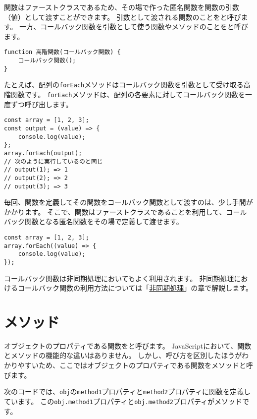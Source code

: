 関数はファーストクラスであるため、その場で作った匿名関数を関数の引数（値）として渡すことができます。
引数として渡される関数のことを\textbf{}と呼びます。
一方、コールバック関数を引数として使う関数やメソッドのことを\textbf{}と呼びます。

\begin{lstlisting}
function 高階関数(コールバック関数) {
    コールバック関数();
}
\end{lstlisting}

たとえば、配列の\texttt{forEach}メソッドはコールバック関数を引数として受け取る高階関数です。
\texttt{forEach}メソッドは、配列の各要素に対してコールバック関数を一度ずつ呼び出します。

\begin{lstlisting}
const array = [1, 2, 3];
const output = (value) => {
    console.log(value);
};
array.forEach(output);
// 次のように実行しているのと同じ
// output(1); => 1
// output(2); => 2
// output(3); => 3
\end{lstlisting}

毎回、関数を定義してその関数をコールバック関数として渡すのは、少し手間がかかります。
そこで、関数はファーストクラスであることを利用して、コールバック関数となる匿名関数をその場で定義して渡せます。

\begin{lstlisting}
const array = [1, 2, 3];
array.forEach((value) => {
    console.log(value);
});
\end{lstlisting}

コールバック関数は非同期処理においてもよく利用されます。
非同期処理におけるコールバック関数の利用方法については「\hyperlink{async-handling}{非同期処理}」の章で解説します。

\hypertarget{method}{%
\section{メソッド}\label{method}}

オブジェクトのプロパティである関数を\textbf{}と呼びます。
JavaScriptにおいて、関数とメソッドの機能的な違いはありません。
しかし、呼び方を区別したほうがわかりやすいため、ここではオブジェクトのプロパティである関数をメソッドと呼びます。

次のコードでは、\texttt{obj}の\texttt{method1}プロパティと\texttt{method2}プロパティに関数を定義しています。
この\texttt{obj.method1}プロパティと\texttt{obj.method2}プロパティがメソッドです。

